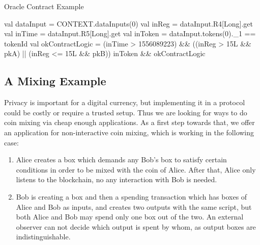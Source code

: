  \begin{algorithm}[H]
    \caption{Oracle Contract Example}
    \label{alg:oracle}
    \begin{algorithmic}[1]
        \State val dataInput = CONTEXT.dataInputs(0)
        \State val inReg = dataInput.R4[Long].get
        \State val inTime = dataInput.R5[Long].get
        \State val inToken = dataInput.tokens(0)._1 == tokenId
        \State val okContractLogic = (inTime > 1556089223) && ((inReg > 15L && pkA) || (inReg <= 15L && pkB))
        \State inToken && okContractLogic
    \end{algorithmic}
 \end{algorithm}


\subsection{A Mixing Example}
 \label{sec:platform}

 Privacy is important for a digital currency, but implementing it in a protocol could be costly or require a trusted
 setup. Thus we are looking for ways to do coin mixing via cheap enough applications. As a first step towards that, we
 offer an application for non-interactive coin mixing, which is working in the following case:
 \begin{enumerate}
    \item{} Alice creates a box which demands any Bob's box to satisfy certain conditions in order to be mixed with
    the coin of Alice. After that, Alice only listens to the blockchain, no any interaction with Bob is needed.
    \item{} Bob is creating a box and then a spending transaction which has boxes of Alice and Bob as inputs,
     and creates two outputs with the same script, but both Alice and Bob may spend only one box out of the two.
     An external observer can not decide which output is spent by whom, as output boxes are indistinguishable.
 \end{enumerate}

